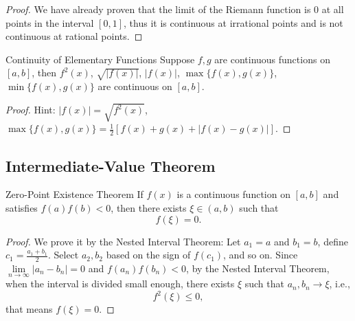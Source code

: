 \begin{proof}
  We have already proven that the limit of the Riemann function is $0$
  at all points in the interval $[0, 1]$,
  thus it is continuous at irrational points and is not continuous at rational points.
\end{proof}

\begin{proposition}{Continuity of Elementary Functions}{}
  Suppose $f, g$ are continuous functions on $[a, b]$,
  then $f^2(x)$, $\sqrt{|f(x)|}$, $|f(x)|$, $\max\{f(x), g(x)\}$, $\min \{f(x), g(x)\}$
  are continuous on $[a, b]$.
\end{proposition}

\begin{proof}
  Hint: $|f(x)| = \sqrt{f^2(x)}$,
  $\max \{f(x), g(x)\} = \frac{1}{2} \left[f(x) + g(x) + |f(x) - g(x)| \right]$.
\end{proof}

\subsection{Intermediate-Value Theorem}

\begin{theorem}{Zero-Point Existence Theorem}{}
  If $f(x)$ is a continuous function on $[a, b]$ and satisfies $f(a)f(b) < 0$,
  then there exists $\xi \in (a, b)$ such that
  \begin{equation}
    f(\xi) = 0.
  \end{equation}
\end{theorem}

\begin{proof}
  We prove it by the Nested Interval Theorem:
  Let $a_1 = a$ and $b_1 = b$, define $c_1 = \frac{a_1 + b_1}{2}$.
  Select $a_2, b_2$ based on the sign of $f(c_1)$,
  and so on.
  Since $\lim \limits _{n \rightarrow \infty} |a_n - b_n| = 0$ and $f(a_n)f(b_n)
  < 0$, by the Nested Interval Theorem,
  when the interval is divided small enough,
  there exists $\xi$ such that $a_n, b_n \rightarrow \xi$, i.e.,
  \begin{equation}
    f^2(\xi) \leq 0,
  \end{equation}
  that means $f(\xi) = 0$.
\end{proof}

